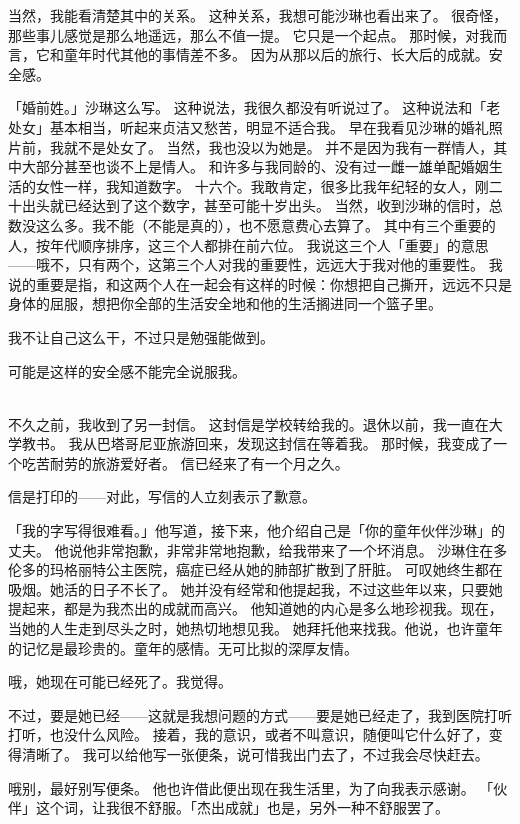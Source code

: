 \documentclass[UTF8]{ctexart}
\begin{document}
当然，我能看清楚其中的关系。
这种关系，我想可能沙琳也看出来了。
很奇怪，那些事儿感觉是那么地遥远，那么不值一提。
它只是一个起点。
那时候，对我而言，它和童年时代其他的事情差不多。
因为从那以后的旅行、长大后的成就。安全感。

「婚前姓。」沙琳这么写。
这种说法，我很久都没有听说过了。
这种说法和「老处女」基本相当，听起来贞洁又愁苦，明显不适合我。
早在我看见沙琳的婚礼照片前，我就不是处女了。
当然，我也没以为她是。
并不是因为我有一群情人，其中大部分甚至也谈不上是情人。
和许多与我同龄的、没有过一雌一雄单配婚姻生活的女性一样，我知道数字。
十六个。我敢肯定，很多比我年纪轻的女人，刚二十出头就已经达到了这个数字，甚至可能十岁出头。
当然，收到沙琳的信时，总数没这么多。我不能（不能是真的），也不愿意费心去算了。
其中有三个重要的人，按年代顺序排序，这三个人都排在前六位。
我说这三个人「重要」的意思——哦不，只有两个，这第三个人对我的重要性，远远大于我对他的重要性。
我说的重要是指，和这两个人在一起会有这样的时候：你想把自己撕开，远远不只是身体的屈服，想把你全部的生活安全地和他的生活搁进同一个篮子里。

我不让自己这么干，不过只是勉强能做到。

可能是这样的安全感不能完全说服我。

~\\

不久之前，我收到了另一封信。
这封信是学校转给我的。退休以前，我一直在大学教书。
我从巴塔哥尼亚旅游回来，发现这封信在等着我。
那时候，我变成了一个吃苦耐劳的旅游爱好者。
信已经来了有一个月之久。

信是打印的——对此，写信的人立刻表示了歉意。

「我的字写得很难看。」他写道，接下来，他介绍自己是「你的童年伙伴沙琳」的丈夫。
他说他非常抱歉，非常非常地抱歉，给我带来了一个坏消息。
沙琳住在多伦多的玛格丽特公主医院，癌症已经从她的肺部扩散到了肝脏。
可叹她终生都在吸烟。她活的日子不长了。
她并没有经常和他提起我，不过这些年以来，只要她提起来，都是为我杰出的成就而高兴。
他知道她的内心是多么地珍视我。现在，当她的人生走到尽头之时，她热切地想见我。
她拜托他来找我。他说，也许童年的记忆是最珍贵的。童年的感情。无可比拟的深厚友情。

哦，她现在可能已经死了。我觉得。

不过，要是她已经——这就是我想问题的方式——要是她已经走了，我到医院打听打听，也没什么风险。
接着，我的意识，或者不叫意识，随便叫它什么好了，变得清晰了。
我可以给他写一张便条，说可惜我出门去了，不过我会尽快赶去。

哦别，最好别写便条。
他也许借此便出现在我生活里，为了向我表示感谢。
「伙伴」这个词，让我很不舒服。「杰出成就」也是，另外一种不舒服罢了。
\end{document}
